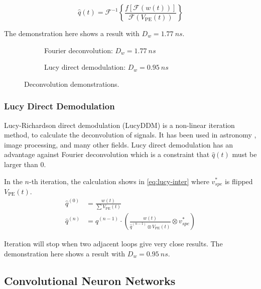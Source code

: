 \begin{equation}
    \hat{q}(t) = \mathcal{F}^{-1}\left\{\frac{f[\mathcal{F}(w(t))]}{\mathcal{F}(V_\mathrm{PE}(t))}\right\}
    \label{eq:fft}
\end{equation}

The demonstration here shows a result with $D_w = \SI{1.77}{ns}$. 

\begin{figure}[H]
  \begin{subfigure}{0.5\textwidth}
    \centering
    \scalebox{0.36}{}
    \caption{Fourier deconvolution: $D_w = \SI{1.77}{ns}$}
  \end{subfigure}
  \begin{subfigure}{0.5\textwidth}
    \centering
    \scalebox{0.36}{}
    \caption{Lucy direct demodulation: $D_w = \SI{0.95}{ns}$}
  \end{subfigure}
  \caption{Deconvolution demonstrations.}
\end{figure}


\subsubsection{Lucy Direct Demodulation}

Lucy-Richardson direct demodulation (LucyDDM) is a non-linear iteration method, to calculate the deconvolution of signals. It has been used in astronomy \cite{li_richardson-lucy_2019}, image processing, and many other fields. Lucy direct demodulation has an advantage against Fourier deconvolution which is a constraint that $\hat{q}(t)$ must be larger than 0. 

In the $n$-th iteration, the calculation shows in \eqref{eq:lucy-inter} where $v^{*}_{spe}$ is flipped $V_\mathrm{PE}(t)$. 
\begin{align}
    \hat{q}^{(0)} &= \frac{w(t)}{\sum V_\mathrm{PE}(t)} \\
    \hat{q}^{(n)} &= \hat{q}^{(n-1)} \cdot \left(\frac{w(t)}{\hat{q}^{(n-1)} \otimes V_\mathrm{PE}(t)} \otimes v^{*}_{spe}\right) \label{eq:lucy-inter}
\end{align}

Iteration will stop when two adjacent loops give very close results. The demonstration here shows a result with $D_w = \SI{0.95}{ns}$. 

\subsection{Convolutional Neuron Networks}


